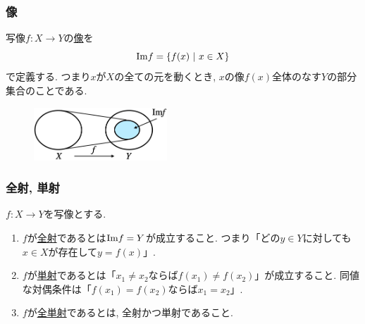 

\begin{frame}
\frametitle{像}


\begin{Def}
写像$f:X\rightarrow Y$の\underline{像}を
$$
\mathrm{Im} f = \{ f(x) \ | \ x \in X\}
$$
で定義する. 
つまり$x$が$X$の全ての元を動くとき, $x$の像$f(x)$全体のなす$Y$の部分集合のことである. 
\end{Def}


 \begin{figure}[htbp]
 \begin{center} 
  \includegraphics[width=50mm]{calculus1/imf.png}
 \end{center}
\end{figure}


\end{frame}



\begin{frame}
\frametitle{全射, 単射}


\begin{Def}$f:X\rightarrow Y$を写像とする. 
\begin{enumerate}
\item $f$が\underline{全射}であるとは$\mathrm{Im} f = Y$が成立すること. 
つまり「どの$y \in Y$に対しても$x \in X$が存在して$y=f(x)$」. 
\item $f$が\underline{単射}であるとは「$x_1\ne x_2$ならば$f(x_1)\ne f(x_2)$」が成立すること. 
同値な対偶条件は「$f(x_1)= f(x_2)$ならば$x_1= x_2$」.  
\item $f$が\underline{全単射}であるとは, 全射かつ単射であること. 
\end{enumerate}
\end{Def}



\end{frame}



